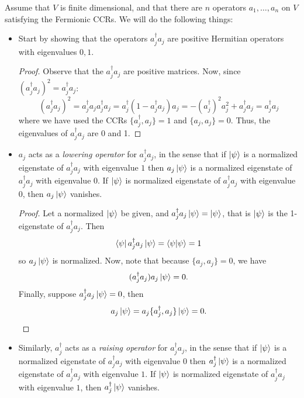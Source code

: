 \documentclass{book}
\theoremstyle{definition}
\begin{document}
Assume that $V$ is finite dimensional, and that there are $n$ operators $a_1,\dots,a_n$ on $V$ satisfying the Fermionic CCRs. We will do the following things:
\begin{itemize}
	\item Start by showing that the operators $a^\dagger_j a_j$ are positive Hermitian operators with eigenvalues $0,1$.
	
	\begin{proof}
		Observe that the $a_j^\dagger a_j$ are positive matrices. Now, since $(a_j^\dagger a_j)^2 = a_j^\dagger a_j$:
		\begin{equation}
		(a_j^\dagger a_j)^2 = a_j^\dagger a_j a_j^\dagger a_j = a_j^\dagger(1-a_j^\dagger a_j)a_j = -(a_j^\dagger)^2 a_j^2+ a_j^\dagger a_j = a_j^\dagger a_j
		\end{equation}
		where we have used the CCRs $\{ a_j^\dagger,a_j \} = 1$ and $\{ a_j,a_j \}=0$.
		Thus, the eigenvalues of $a_j^\dagger a_j$ are 0 and 1. 
	\end{proof}
	
	
	\item $a_j$ acts as a \textit{lowering operator} for $a^\dagger_j a_j$, in the sense that if $\ket{\psi}$ is a normalized eigenstate of $a_j^\dagger a_j$ with eigenvalue $1$ then $a_j \ket{\psi}$ is a normalized eigenstate of $a^\dagger_j a_j$ with eigenvalue $0$. If $\ket{\psi}$ is normalized eigenstate of $a^\dagger_j a_j$ with eigenvalue $0$, then $a_j \ket{\psi}$ vanishes. 
	
	\begin{proof}
		Let a normalized $\ket{\psi}$ be given, and $a_j^\dagger a_j\ket{\psi} = \ket{\psi}$, that is $\ket{\psi}$ is the 1-eigenstate of $a_j^\dagger a_j$. Then 
		\begin{equation}
		\bra{\psi} a_j^\dagger a_j \ket{\psi} = \braket{\psi} = 1
		\end{equation}
		so $a_j\ket{\psi}$ is normalized. Now, note that because $\{a_j,a_j \}=0$, we have
		\begin{equation}
		(a_j^\dagger a_j)a_j\ket{\psi} = 0.
		\end{equation} 
		Finally, suppose $a_j^\dagger a_j \ket{\psi} = 0$, then 
		\begin{equation}
		a_j\ket{\psi} = a_j \{ a_j^\dagger,a_j \}\ket{\psi} = 0.
		\end{equation}
	\end{proof}
	
	
	\item Similarly, $a_j^\dagger$ acts as a \textit{raising operator} for $a^\dagger_j a_j$, in the sense that if $\ket{\psi}$ is a normalized eigenstate of $a_j^\dagger a_j$ with eigenvalue $0$ then $a^\dagger_j  \ket{\psi}$ is a normalized eigenstate of $a^\dagger_j a_j$ with eigenvalue $1$. If $\ket{\psi}$ is normalized eigenstate of $a^\dagger_j a_j$ with eigenvalue $1$, then $a_j^\dagger \ket{\psi}$ vanishes. 
	

\end{itemize}
\end{document}
